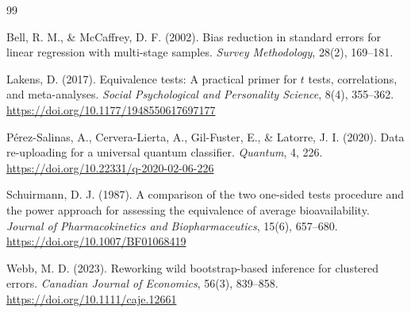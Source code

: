\documentclass[11pt,a4paper]{article}
\begin{document}
\begin{thebibliography}{99}

Bell, R. M., \& McCaffrey, D. F. (2002). Bias reduction in standard errors for linear regression with multi-stage samples. \textit{Survey Methodology}, 28(2), 169--181.

Lakens, D. (2017). Equivalence tests: A practical primer for $t$ tests, correlations, and meta-analyses. \textit{Social Psychological and Personality Science}, 8(4), 355--362. \url{https://doi.org/10.1177/1948550617697177}


P\'erez-Salinas, A., Cervera-Lierta, A., Gil-Fuster, E., \& Latorre, J. I. (2020). Data re-uploading for a universal quantum classifier. \textit{Quantum}, 4, 226. \url{https://doi.org/10.22331/q-2020-02-06-226}

Schuirmann, D. J. (1987). A comparison of the two one-sided tests procedure and the power approach for assessing the equivalence of average bioavailability. \textit{Journal of Pharmacokinetics and Biopharmaceutics}, 15(6), 657--680. \url{https://doi.org/10.1007/BF01068419}

Webb, M. D. (2023). Reworking wild bootstrap-based inference for clustered errors. \textit{Canadian Journal of Economics}, 56(3), 839--858. \url{https://doi.org/10.1111/caje.12661}

\end{thebibliography}
\end{document}
